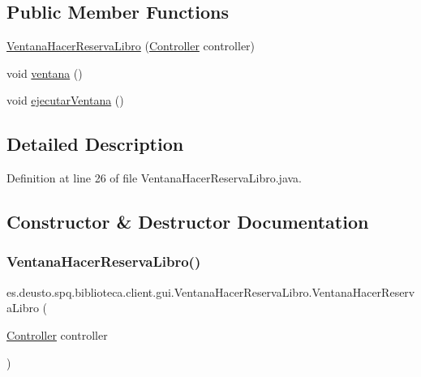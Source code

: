 \subsection*{Public Member Functions}
\begin{DoxyCompactItemize}
\item 
\mbox{\hyperlink{classes_1_1deusto_1_1spq_1_1biblioteca_1_1client_1_1gui_1_1_ventana_hacer_reserva_libro_a2051a98a4c3b510430ea940cb77581e3}{Ventana\+Hacer\+Reserva\+Libro}} (\mbox{\hyperlink{classes_1_1deusto_1_1spq_1_1biblioteca_1_1controller_1_1_controller}{Controller}} controller)
\item 
void \mbox{\hyperlink{classes_1_1deusto_1_1spq_1_1biblioteca_1_1client_1_1gui_1_1_ventana_hacer_reserva_libro_a62aec2a93b911472883ffb3bb83f3d92}{ventana}} ()
\item 
void \mbox{\hyperlink{classes_1_1deusto_1_1spq_1_1biblioteca_1_1client_1_1gui_1_1_ventana_hacer_reserva_libro_ad2b020fc4a4ef8fb18848f75c31836e7}{ejecutar\+Ventana}} ()
\end{DoxyCompactItemize}


\subsection{Detailed Description}


Definition at line 26 of file Ventana\+Hacer\+Reserva\+Libro.\+java.



\subsection{Constructor \& Destructor Documentation}
\mbox{\label{classes_1_1deusto_1_1spq_1_1biblioteca_1_1client_1_1gui_1_1_ventana_hacer_reserva_libro_a2051a98a4c3b510430ea940cb77581e3}} 
\subsubsection{\texorpdfstring{Ventana\+Hacer\+Reserva\+Libro()}{VentanaHacerReservaLibro()}}
{\footnotesize\ttfamily es.\+deusto.\+spq.\+biblioteca.\+client.\+gui.\+Ventana\+Hacer\+Reserva\+Libro.\+Ventana\+Hacer\+Reserva\+Libro (\begin{DoxyParamCaption}\item[{\mbox{\hyperlink{classes_1_1deusto_1_1spq_1_1biblioteca_1_1controller_1_1_controller}{Controller}}}]{controller }\end{DoxyParamCaption})}

